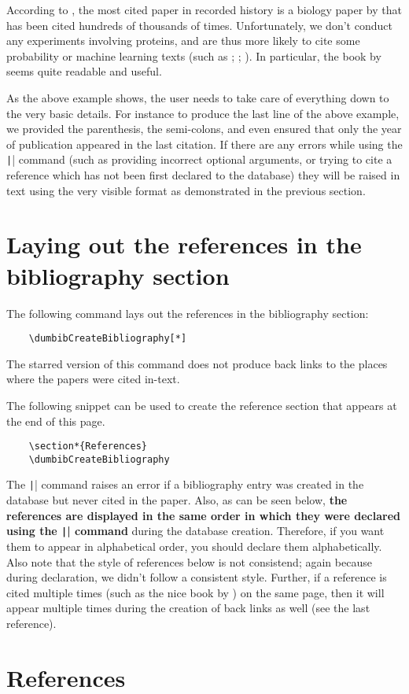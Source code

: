 \documentclass[letter, 11pt]{article}
\begin{document}
      According to \cite{noorden2014}, the most cited paper in recorded history is a biology paper by \cite[a]{lowry1951} that has been cited hundreds of thousands of times. Unfortunately, we don't conduct any experiments involving proteins, and are thus more likely to cite some probability or machine learning texts (such as \cite*{talagrand2022}; \cite*{bach2023a}; \cite[y]{bach2023b}). In particular, the book by \cite{talagrand2022} seems quite readable and useful.
  
  As the above example shows, the user needs to take care of everything down to the very basic details. For instance to produce the last line of the above example, we provided the parenthesis, the semi-colons, and even ensured that only the year of publication appeared in the last citation. If there are any errors while using the \texttt|\cite{}| command (such as providing incorrect optional arguments, or trying to cite a reference which has not been first declared to the \dumbib database) they will be raised in text using the very visible format as demonstrated in the previous section.
  
  \section{Laying out the references in the bibliography section}
  The following command lays out the references in the bibliography section:
  \begin{verbatim}
    \dumbibCreateBibliography[*]
  \end{verbatim}
  The starred version of this command does not produce back links to the places where the papers were cited in-text.

  The following snippet can be used to create the reference section that appears at the end of this page.

  \begin{verbatim}
    \section*{References}
    \dumbibCreateBibliography
  \end{verbatim}

  The \texttt|\dumbibCreateBibliography| command raises an error if a bibliography entry was created in the database but never cited in the paper. Also, as can be seen below, \textbf{the references are displayed in the same order in which they were declared using the \texttt|\dumbibReferenceEntry{}| command} during the database creation. Therefore, if you want them to appear in alphabetical order, you should declare them alphabetically. Also note that the style of references below is not consistend; again because during declaration, we didn't follow a consistent style. Further, if a reference is cited multiple times (such as the nice book by \cite{talagrand2022}) on the same page, then it will appear multiple times during the creation of back links as well (see the last reference).

  \section*{References}
  \dumbibCreateBibliography
\end{document}

